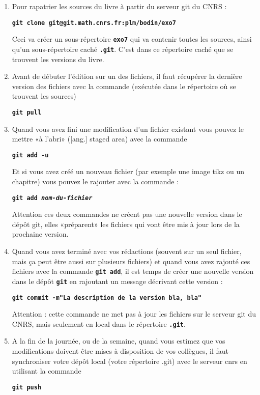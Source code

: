 \documentclass[11pt]{article} %
\newcommand{\cmd}[1]{\textbf{\texttt{\color{red!70!black}#1}}}
\begin{document}
\begin{enumerate}
  \item Pour rapatrier les sources du livre à partir du serveur git du CNRS :

  \cmd{git clone git@git.math.cnrs.fr:plm/bodin/exo7}

  Ceci va créer un sous-répertoire \cmd{exo7} qui va contenir toutes les sources, ainsi qu'un sous-répertoire caché \cmd{.git}. C'est dans ce répertoire caché que se trouvent les versions du livre.

  \item Avant de débuter l'édition sur un des fichiers, il faut récupérer la dernière version des fichiers avec la commande (exécutée dans le répertoire où se trouvent les sources)

  \cmd{git pull}

  \item Quand vous avez fini une modification d'un fichier existant vous pouvez le mettre «à l'abri» ([ang.] staged area) avec la commande

  \cmd{git add -u}

  Et si vous avez créé un nouveau fichier (par exemple une image tikz ou un chapitre) vous pouvez le rajouter avec la commande :

  \cmd{git add \textit{nom-du-fichier}}

  Attention ces deux commandes ne créent pas une nouvelle version dans le dépôt git, elles «préparent» les fichiers qui vont être mis à jour lors de la prochaine version.

   \item Quand vous avez terminé avec vos rédactions (souvent sur un seul fichier, mais ça peut être aussi sur plusieurs fichiers) et quand vous avez rajouté ces fichiers avec la commande \cmd{git add}, il est temps de créer une nouvelle version dans le dépôt \cmd{git} en rajoutant un message décrivant cette version :

   \cmd{git commit -m"La description de la version bla, bla"}

   Attention : cette commande ne met pas à jour les fichiers sur le serveur git du CNRS, mais seulement en local dans le répertoire \cmd{.git}.

   \item A la fin de la journée, ou de la semaine, quand vous estimez que vos modifications doivent être mises à disposition de vos collègues, il faut synchroniser votre dépôt local (votre répertoire .git) avec le serveur cnrs en utilisant la commande

   \cmd{git push}
\end{enumerate}
\end{document}
